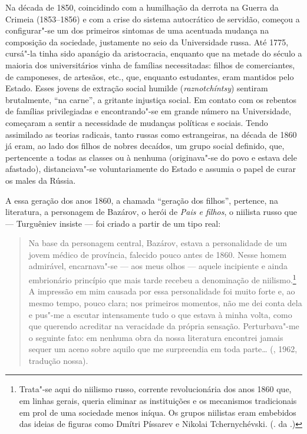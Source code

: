 Na década de 1850, coincidindo com a humilhação da derrota na Guerra da Crimeia (1853--1856) e
com a crise do sistema autocrático de servidão, começou a configurar"-se
um dos primeiros sintomas de uma acentuada mudança na composição da
sociedade, justamente no seio da Universidade russa. Até 1775, cursá"-la tinha
sido apanágio da aristocracia, enquanto que na metade do século  a
maioria dos universitários vinha de famílias necessitadas:
filhos de comerciantes, de camponeses, de artesãos, etc., que,
enquanto estudantes, eram mantidos pelo Estado. Esses jovens de extração
social humilde (\emph{raznotchíntsy}) sentiram brutalmente, ``na carne'', a
gritante injustiça social. Em contato com os rebentos de famílias
privilegiadas e encontrando"-se em grande número na Universidade,
começaram a sentir a necessidade de mudanças políticas e sociais.
Tendo assimilado as teorias radicais, tanto russas como estrangeiras, na
década de 1860 já eram, ao lado dos filhos de nobres decaídos, um grupo social definido, que,
pertencente a todas as classes ou à nenhuma (originava"-se do povo e estava dele afastado), distanciava"-se
voluntariamente do Estado e assumia o papel de curar os males da
Rússia.

A essa geração dos anos 1860, a chamada ``geração dos filhos'', pertence, na literatura, a personagem de Bazárov, o herói de \emph{Pais
e filhos}, o niilista russo que --- Turguêniev insiste --- foi criado a
partir de um tipo real:

\begin{quotation}
Na base da personagem central, Bazárov, estava a personalidade de um
jovem médico de província, falecido pouco antes de 1860. Nesse homem
admirável, encarnava"-se --- aos meus olhos --- aquele incipiente e ainda
embrionário princípio que mais tarde recebeu a denominação de niilismo.\footnote{Trata"-se aqui do niilismo russo, corrente revolucionária dos anos 1860 que, em linhas gerais, queria eliminar as instituições e os mecanismos tradicionais em prol de uma sociedade menos iníqua. Os grupos niilistas eram embebidos das ideias de figuras como Dmítri Píssarev e Nikolai Tchernychévski. (. da .)}
A impressão em mim causada por essa personalidade foi muito forte e, ao
mesmo tempo, pouco clara; nos primeiros momentos, não me dei conta dela
e pus"-me a escutar intensamente tudo o que estava à minha volta, como
que querendo acreditar na veracidade da própria sensação. Perturbava"-me
o seguinte fato: em nenhuma obra da nossa literatura encontrei jamais
sequer um aceno sobre aquilo que me surpreendia em toda parte\ldots{} (, 1962, tradução nossa).
\end{quotation}

